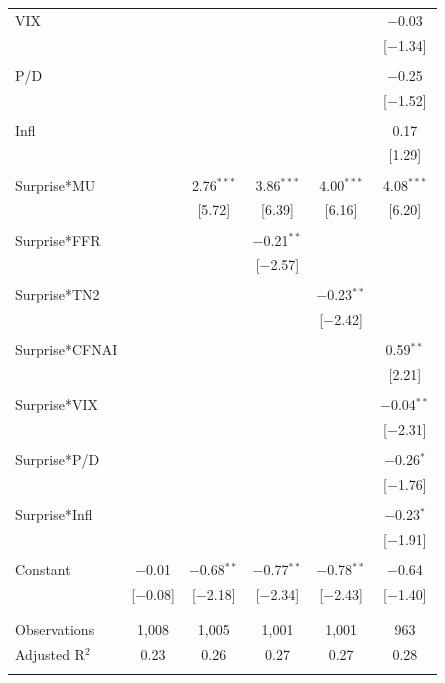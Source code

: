 \documentclass[12pt]{article}
\begin{document}
\begin{table}[!htbp]
{\begin{tabular}{@{\extracolsep{5pt}}lccccc}
 VIX &  &  &  &  & $-$0.03 \\ 
  &  &  &  &  & [$-$1.34] \\ 
  & & & & & \\ 
 P/D &  &  &  &  & $-$0.25 \\ 
  &  &  &  &  & [$-$1.52] \\ 
  & & & & & \\ 
 Infl &  &  &  &  & 0.17 \\ 
  &  &  &  &  & [1.29] \\ 
  & & & & & \\ 
 Surprise*MU &  & 2.76$^{***}$ & 3.86$^{***}$ & 4.00$^{***}$ & 4.08$^{***}$ \\
  &  & [5.72] & [6.39] & [6.16] & [6.20] \\ 
  & & & & & \\ 
 Surprise*FFR &  &  & $-$0.21$^{**}$ &  &  \\ 
  &  &  & [$-$2.57] &  &  \\ 
  & & & & & \\ 
 Surprise*TN2 &  &  &  & $-$0.23$^{**}$ &  \\ 
  &  &  &  & [$-$2.42] &  \\ 
  & & & & & \\ 
 Surprise*CFNAI &  &  &  &  & 0.59$^{**}$ \\ 
  &  &  &  &  & [2.21] \\ 
  & & & & & \\ 
 Surprise*VIX &  &  &  &  & $-$0.04$^{**}$ \\ 
  &  &  &  &  & [$-$2.31] \\ 
  & & & & & \\ 
 Surprise*P/D &  &  &  &  & $-$0.26$^{*}$ \\ 
  &  &  &  &  & [$-$1.76] \\ 
  & & & & & \\ 
 Surprise*Infl &  &  &  &  & $-$0.23$^{*}$ \\ 
  &  &  &  &  & [$-$1.91] \\ 
  & & & & & \\ 
 Constant & $-$0.01 & $-$0.68$^{**}$ & $-$0.77$^{**}$ & $-$0.78$^{**}$ & $-$0.64 \\ 
  & [$-$0.08] & [$-$2.18] & [$-$2.34] & [$-$2.43] & [$-$1.40] \\ 
  & & & & & \\ 
\hline \\[-1.8ex] 
Observations & 1,008 & 1,005 & 1,001 & 1,001 & 963 \\ 
Adjusted R$^{2}$ & 0.23 & 0.26 & 0.27 & 0.27 & 0.28 \\ 
\hline 
\hline \\[-1.8ex] 
\end{tabular}  
}
\end{table}
\end{document}
